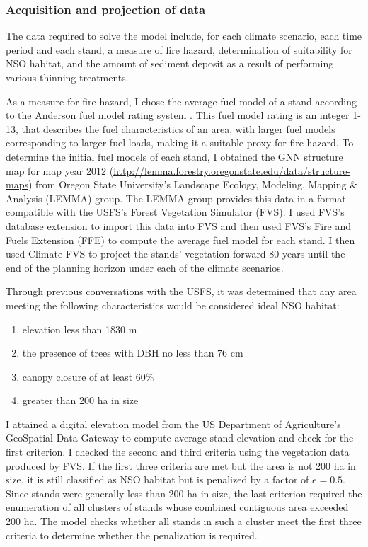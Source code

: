 \subsubsection{Acquisition and projection of data}
The data required to solve the model include, for each climate scenario, each time period and each stand, a measure of fire hazard, determination of suitability for NSO habitat, and the amount of sediment deposit as a result of performing various thinning treatments.

As a measure for fire hazard, I chose the average fuel model of a stand according to the Anderson fuel model rating system \cite{anderson1982aids}. This fuel model rating is an integer 1-13, that describes the fuel characteristics of an area, with larger fuel models corresponding to larger fuel loads, making it a suitable proxy for fire hazard. To determine the initial fuel models of each stand, I obtained the GNN structure map for map year 2012 (\url{http://lemma.forestry.oregonstate.edu/data/structure-maps}) from Oregon State University's Landscape Ecology, Modeling, Mapping \& Analysis (LEMMA) group. The LEMMA group provides this data in a format compatible with the USFS's Forest Vegetation Simulator (FVS). I used FVS's database extension to import this data into FVS and then used FVS's Fire and Fuels Extension\cite{reinhardt2003fire} (FFE) to compute the average fuel model for each stand. I then used Climate-FVS to project the stands' vegetation forward 80 years until the end of the planning horizon under each of the climate scenarios.

Through previous conversations with the USFS, it was determined that any area meeting the following characteristics would be considered ideal NSO habitat:
\begin{enumerate}
\item elevation less than 1830 m
\item the presence of trees with DBH no less than 76 cm
\item canopy closure of at least 60\%
\item greater than 200 ha in size
\end{enumerate}
I attained a digital elevation model from the US Department of Agriculture's GeoSpatial Data Gateway to compute average stand elevation and check for the first criterion. I checked the second and third criteria using the vegetation data produced by FVS. If the first three criteria are met but the area is not 200 ha in size, it is still classified as NSO habitat but is penalized by a factor of $e = 0.5$. Since stands were generally less than 200 ha in size, the last criterion required the enumeration of all clusters of stands whose combined contiguous area exceeded 200 ha. The model checks whether all stands in such a cluster meet the first three criteria to determine whether the penalization is required.

